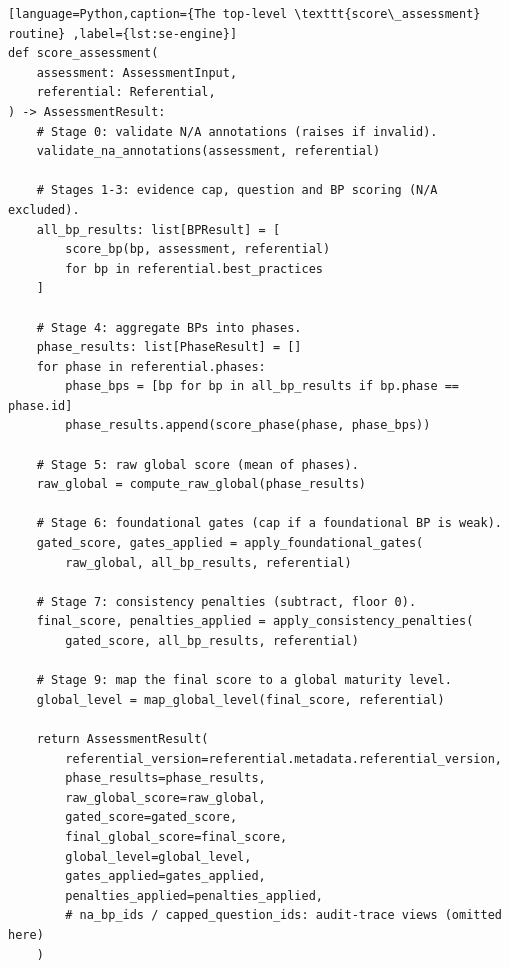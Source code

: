 \begin{lstlisting}[language=Python,caption={The top-level \texttt{score\_assessment} routine} ,label={lst:se-engine}]
def score_assessment(
    assessment: AssessmentInput,
    referential: Referential,
) -> AssessmentResult:
    # Stage 0: validate N/A annotations (raises if invalid).
    validate_na_annotations(assessment, referential)

    # Stages 1-3: evidence cap, question and BP scoring (N/A excluded).
    all_bp_results: list[BPResult] = [
        score_bp(bp, assessment, referential)
        for bp in referential.best_practices
    ]

    # Stage 4: aggregate BPs into phases.
    phase_results: list[PhaseResult] = []
    for phase in referential.phases:
        phase_bps = [bp for bp in all_bp_results if bp.phase == phase.id]
        phase_results.append(score_phase(phase, phase_bps))

    # Stage 5: raw global score (mean of phases).
    raw_global = compute_raw_global(phase_results)

    # Stage 6: foundational gates (cap if a foundational BP is weak).
    gated_score, gates_applied = apply_foundational_gates(
        raw_global, all_bp_results, referential)

    # Stage 7: consistency penalties (subtract, floor 0).
    final_score, penalties_applied = apply_consistency_penalties(
        gated_score, all_bp_results, referential)

    # Stage 9: map the final score to a global maturity level.
    global_level = map_global_level(final_score, referential)

    return AssessmentResult(
        referential_version=referential.metadata.referential_version,
        phase_results=phase_results,
        raw_global_score=raw_global,
        gated_score=gated_score,
        final_global_score=final_score,
        global_level=global_level,
        gates_applied=gates_applied,
        penalties_applied=penalties_applied,
        # na_bp_ids / capped_question_ids: audit-trace views (omitted here)
    )
\end{lstlisting}

\clearpage

